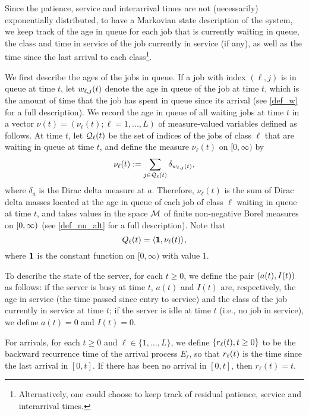 \documentclass[stsy]{informs-stsy}
\begin{document}
Since the patience, service  and interarrival times are not (necessarily) exponentially distributed, to have a Markovian state description of the system, we keep track of the age in queue for each job that is currently waiting in queue, the class and   time in service  of the job currently in  service (if any), as well as the time since the last arrival to each class\footnote{Alternatively, one could choose to keep track of residual patience, service and interarrival times.}. 

We first describe the ages of the jobs in queue.
If a job with index $(\ell,j)$ is in queue at time $t$,  let $w_{\ell,j}(t)$ denote the age in queue of the job at time $t$, which is the amount of time that the job has spent in queue since its arrival (see \eqref{def_w} for a full description). We record the age in queue of all waiting jobs at time $t$ in a vector $\nu(t)=(\nu_\ell(t);\ell=1,...,L)$ of measure-valued variables defined as follows. At time $t$, let $\mathcal{Q}_\ell(t)$ be the set of indices of the jobs of class $\ell$ that are waiting in queue at time $t$,  and define the measure $\nu_\ell(t)$ on $[0,\infty)$ by
\begin{equation}\label{def_nuk_early}
  \nu_\ell(t):= \sum_{j\in\mathcal{Q}_\ell(t)}\delta_{w_{\ell,j}(t)},
\end{equation}
where $\delta_a$ is the Dirac delta measure at $a$. Therefore, $\nu_\ell(t)$ is the sum of Dirac delta masses located at the age in queue of each job of class $\ell$ waiting in queue at time $t$, and takes values in the space $\mathcal{M}$ of finite non-negative Borel measures on $[0,\infty)$ (see \eqref{def_nu_alt} for a full description).  Note that 
\begin{equation}
  \ql_\ell(t)=\langle\f1,\nu_\ell(t)\rangle,
\end{equation}
where $\f1$ is the constant function on $[0,\infty)$ with value 1.

To describe the state of the server, for each $t\geq 0$, we define the pair $(a(t),I(t))$ as follows: if the server is busy at time $t$, $a(t)$ and $I(t)$ are, respectively, the age in service (the time passed since entry to service) and the class of the job currently in service at time $t$; if the server is idle at time $t$ (i.e., no job in service), we define $a(t)=0$ and $I(t)=0$. 

For arrivals, for each $t\geq 0$ and $\ell \in \{ 1, \ldots, L\}$, we define $\{r_{\ell}(t),t\geq0\}$ to be the backward recurrence time of the arrival process $E_\ell$, so that $r_{\ell}(t)$ is the time since the last arrival in $[0,t]$.  If there has been no arrival in $[0,t]$, then $r_\ell(t) =t$.
\end{document}
